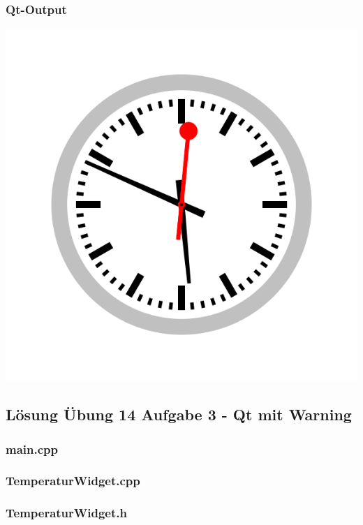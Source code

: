 \subsubsection{Qt-Output}
\begin{center}
	\includegraphics[scale=.5]{./images/u14a2.png}
\end{center}

\newpage
\subsection{Lösung Übung 14 Aufgabe 3 - Qt mit Warning}
\subsubsection{main.cpp}

\subsubsection{TemperaturWidget.cpp}

\subsubsection{TemperaturWidget.h}


